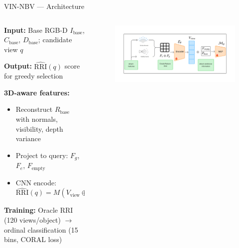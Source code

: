 \documentclass[10pt,aspectratio=169]{beamer}
\begin{document}
\begin{frame}{VIN-NBV --- Architecture}
\begin{columns}[T]
\begin{column}{0.58\textwidth}
\textbf{Input:} Base RGB-D $I_{\text{base}}$, $C_{\text{base}}$, $D_{\text{base}}$; candidate view $q$

\vspace{0.5em}
\textbf{Output:} \(\widehat{\mathrm{RRI}}(q)\) score for greedy selection

\vspace{0.5em}
\textbf{3D-aware features:}
\begin{itemize}
  \item Reconstruct $R_{\text{base}}$ with normals, visibility, depth variance
  \item Project to query: $F_g$, $F_e$, $F_{\text{empty}}$
  \item CNN encode: $\widehat{\mathrm{RRI}}(q)=M(V_{\text{view}}\oplus f_{\text{base}}\oplus f_{\text{pose}})$
\end{itemize}

\vspace{0.5em}
\textbf{Training:} Oracle RRI (120 views/object) $\rightarrow$ ordinal classification (15 bins, CORAL loss)
\end{column}
\begin{column}{0.40\textwidth}
\vspace{-1em}
\begin{figure}
  \centering
  \includegraphics[width=\textwidth]{../../literature/tex-src/VIN-NBV/Figures/VIN_arch.png}
\end{figure}
\end{column}
\end{columns}
\end{frame}
\end{document}
